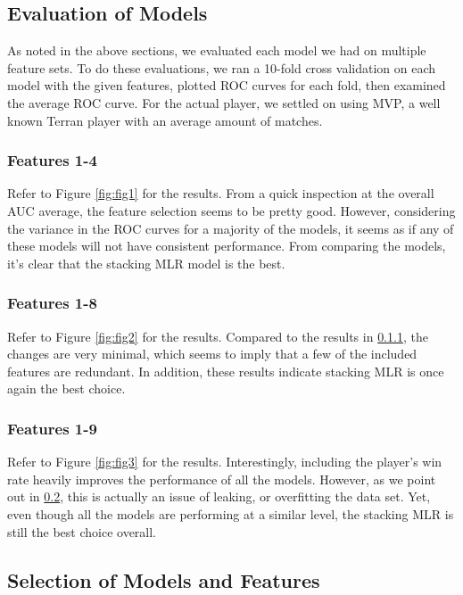 \subsection{Evaluation of Models}
\label{sec:evaluation}
As noted in the above sections, we evaluated each model we had on multiple feature sets. To do these evaluations, we ran a 10-fold cross validation on each model with the given features, plotted ROC curves for each fold, then examined the average ROC curve. For the actual player, we settled on using MVP, a well known Terran player with an average amount of matches.

\subsubsection{Features 1-4}
\label{sec:evaluation1}
Refer to Figure \ref{fig:fig1} for the results. From a quick inspection at the overall AUC average, the feature selection seems to be pretty good. However, considering the variance in the ROC curves for a majority of the models, it seems as if any of these models will not have consistent performance. From comparing the models, it's clear that the stacking MLR model is the best.

\subsubsection{Features 1-8}
\label{sec:evaluation2}
Refer to Figure \ref{fig:fig2} for the results. Compared to the results in \ref{sec:evaluation1}, the changes are very minimal, which seems to imply that a few of the included features are redundant. In addition, these results indicate stacking MLR is once again the best choice.

\subsubsection{Features 1-9}
\label{sec:evaluation3}
Refer to Figure \ref{fig:fig3} for the results. Interestingly, including the player's win rate heavily improves the performance of all the models. However, as we point out in \ref{sec:selection}, this is actually an issue of leaking, or overfitting the data set. Yet, even though all the models are performing at a similar level, the stacking MLR is still the best choice overall.

\subsection{Selection of Models and Features}
\label{sec:selection}


